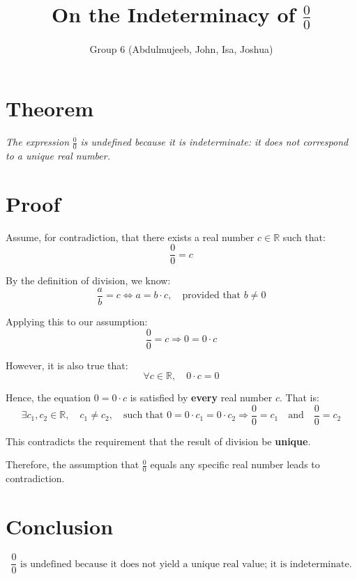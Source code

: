 \documentclass[12pt]{article}
\title{On the Indeterminacy of \texorpdfstring{$\frac{0}{0}$}{0/0}}
\author{Group 6 (Abdulmujeeb, John, Isa, Joshua)}
\date{}
\begin{document}
\section*{Theorem}
\textit{The expression} \( \frac{0}{0} \) \textit{is undefined because it is indeterminate: it does not correspond to a unique real number.}

\section*{Proof}

Assume, for contradiction, that there exists a real number \( c \in \mathbb{R} \) such that:
\[
\frac{0}{0} = c
\]

By the definition of division, we know:
\[
\frac{a}{b} = c \iff a = b \cdot c, \quad \text{provided that } b \neq 0
\]

Applying this to our assumption:
\[
\frac{0}{0} = c \Rightarrow 0 = 0 \cdot c
\]

However, it is also true that:
\[
\forall c \in \mathbb{R},\quad 0 \cdot c = 0
\]

Hence, the equation \( 0 = 0 \cdot c \) is satisfied by \textbf{every} real number \( c \). That is:
\[
\exists c_1, c_2 \in \mathbb{R},\quad c_1 \ne c_2,\quad \text{such that } 0 = 0 \cdot c_1 = 0 \cdot c_2
\Rightarrow \frac{0}{0} = c_1 \quad \text{and} \quad \frac{0}{0} = c_2
\]

This contradicts the requirement that the result of division be \textbf{unique}.

\medskip

\noindent Therefore, the assumption that \( \frac{0}{0} \) equals any specific real number leads to contradiction.

\section*{Conclusion}

\[
\boxed{
\frac{0}{0} \text{ is undefined because it does not yield a unique real value; it is indeterminate.}
}
\]
\end{document}
